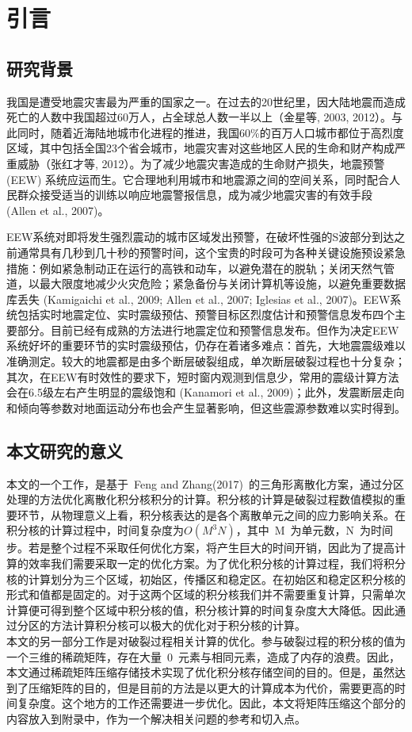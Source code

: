 
\chapter{引言}
\section{研究背景}
\indent 我国是遭受地震灾害最为严重的国家之一。在过去的20世纪里，因大陆地震而造成死亡的人数中我国超过60万人，占全球总人数一半以上（金星等, 2003, 2012）。与此同时，随着近海陆地城市化进程的推进，我国60\%的百万人口城市都位于高烈度区域，其中包括全国23个省会城市，地震灾害对这些地区人民的生命和财产构成严重威胁（张红才等, 2012）。为了减少地震灾害造成的生命财产损失，地震预警 (EEW) 系统应运而生。它合理地利用城市和地震源之间的空间关系，同时配合人民群众接受适当的训练以响应地震警报信息，成为减少地震灾害的有效手段 (Allen et al., 2007)。


 \indent EEW系统对即将发生强烈震动的城市区域发出预警，在破坏性强的S波部分到达之前通常具有几秒到几十秒的预警时间，这个宝贵的时段可为各种关键设施预设紧急措施：例如紧急制动正在运行的高铁和动车，以避免潜在的脱轨；关闭天然气管道，以最大限度地减少火灾危险；紧急备份与关闭计算机等设施，以避免重要数据库丢失 (Kamigaichi et al., 2009; Allen et al., 2007; Iglesias et al., 2007)。EEW系统包括实时地震定位、实时震级预估、预警目标区烈度估计和预警信息发布四个主要部分。目前已经有成熟的方法进行地震定位和预警信息发布。但作为决定EEW系统好坏的重要环节的实时震级预估，仍存在着诸多难点：首先，大地震震级难以准确测定。较大的地震都是由多个断层破裂组成，单次断层破裂过程也十分复杂；其次，在EEW有时效性的要求下，短时窗内观测到信息少，常用的震级计算方法会在6.5级左右产生明显的震级饱和 (Kanamori et al., 2009)；此外，发震断层走向和倾向等参数对地面运动分布也会产生显著影响，但这些震源参数难以实时得到。

    \section{本文研究的意义}
\indent 本文的一个工作，是基于~Feng and Zhang(2017)~的三角形离散化方案，通过分区处理的方法优化离散化积分核积分的计算。积分核的计算是破裂过程数值模拟的重要环节，从物理意义上看，积分核表达的是各个离散单元之间的应力影响关系。在积分核的计算过程中，时间复杂度为$O(M^{3}N)$，其中~M~为单元数，N~为时间步。若是整个过程不采取任何优化方案，将产生巨大的时间开销，因此为了提高计算的效率我们需要采取一定的优化方案。为了优化积分核的计算过程，我们将积分核的计算划分为三个区域，初始区，传播区和稳定区。在初始区和稳定区积分核的形式和值都是固定的。对于这两个区域的积分核我们并不需要重复计算，只需单次计算便可得到整个区域中积分核的值，积分核计算的时间复杂度大大降低。因此通过分区的方法计算积分核可以极大的优化对于积分核的计算。\\
\indent 本文的另一部分工作是对破裂过程相关计算的优化。参与破裂过程的积分核的值为一个三维的稀疏矩阵，存在大量~0~元素与相同元素，造成了内存的浪费。因此，本文通过稀疏矩阵压缩存储技术实现了优化积分核存储空间的目的。但是，虽然达到了压缩矩阵的目的，但是目前的方法是以更大的计算成本为代价，需要更高的时间复杂度。这个地方的工作还需要进一步优化。因此，本文将矩阵压缩这个部分的内容放入到附录中，作为一个解决相关问题的参考和切入点。
\indent
